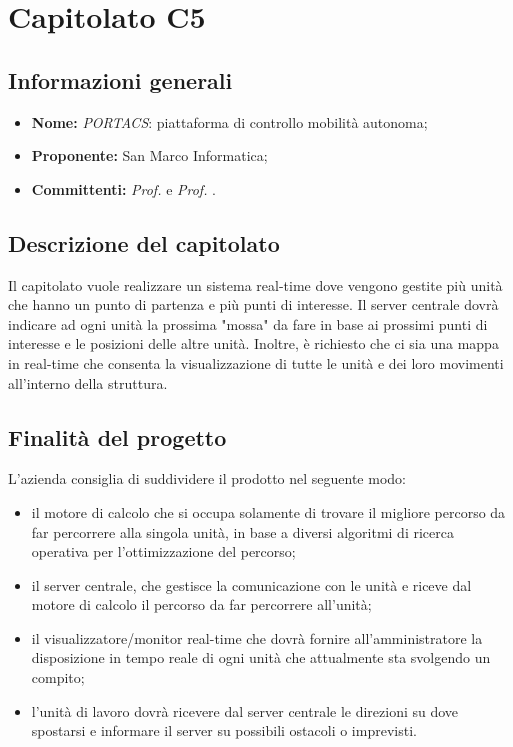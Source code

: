 \section{Capitolato C5}

\subsection{Informazioni generali}
\begin{itemize}
\item \textbf{Nome:} \textit{PORTACS}: piattaforma di controllo mobilità autonoma;
\item \textbf{Proponente:} San Marco Informatica;
\item \textbf{Committenti:} \textit{Prof. \Tullio{}} e \textit{Prof. \Riccardo{}}.
\end{itemize}

\subsection{Descrizione del capitolato}
Il capitolato vuole realizzare un sistema real-time dove vengono gestite più unità che hanno un punto di partenza e più punti di interesse.
Il server centrale dovrà indicare ad ogni unità la prossima "mossa" da fare in base ai prossimi punti di interesse e le posizioni delle altre unità. 
Inoltre, è richiesto che ci sia una mappa in real-time che consenta la visualizzazione di tutte le unità e dei loro movimenti all'interno della struttura.

\subsection{Finalità del progetto}
L'azienda consiglia di suddividere il prodotto nel seguente modo:
\begin{itemize}
\item il motore di calcolo che si occupa solamente di trovare il migliore percorso da far percorrere alla singola unità, in base a diversi algoritmi di ricerca operativa per l'ottimizzazione del percorso;
\item il server centrale, che gestisce la comunicazione con le unità e riceve dal motore di calcolo il percorso da far percorrere all'unità;
\item il visualizzatore/monitor real-time che dovrà fornire all'amministratore la disposizione in tempo reale di ogni unità che attualmente sta svolgendo un compito;
\item l'unità di lavoro dovrà ricevere dal server centrale le direzioni su dove spostarsi e informare il server su possibili ostacoli o imprevisti.
\end{itemize}

